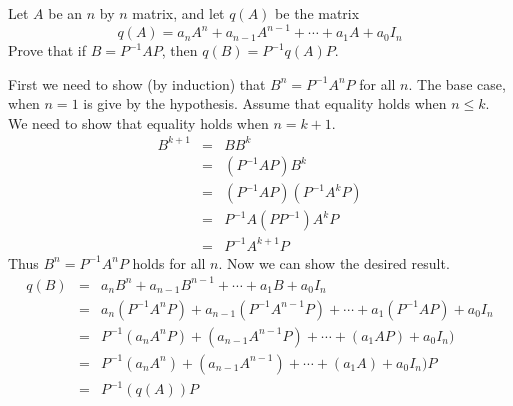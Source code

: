 \ii \label{ex:conjpoly}
Let $A$ be an $n$ by $n$ matrix, and let $q(A)$ be the matrix
$$
q(A) = a_nA^n +a_{n-1}A^{n-1}+\cdots+a_1A+a_0I_n
$$
Prove that if $B = P^{-1}AP$, then $q(B) = P^{-1}q(A)P$.
\\
\begin{solution}
First we need to show (by induction) that $B^n =P^{-1}A^nP$ for all $n$. The base case, when $n=1$ is give by the hypothesis. Assume that equality holds when $n \leq k$. We need to show that equality holds when $n = k+1$.
\begin{eqnarray*}
B^{k+1} &=& BB^k\\
&=&(P^{-1}AP)B^k\\
&=& (P^{-1}AP)(P^{-1}A^kP)\\
&=& P^{-1}A(PP^{-1})A^kP\\
&=&P^{-1}A^{k+1}P
\end{eqnarray*}
Thus $B^n =P^{-1}A^nP$ holds for all $n$. Now we can show the desired result.
\begin{eqnarray*}
q(B) &=& a_nB^n + a_{n-1}B^{n-1}+\cdots+a_1B+a_0I_n\\
&=& a_n(P^{-1}A^nP) + a_{n-1}(P^{-1}A^{n-1}P)+\cdots+a_1(P^{-1}AP)+a_0I_n\\
&=& P^{-1}(a_nA^nP) + (a_{n-1}A^{n-1}P)+\cdots+(a_1AP)+a_0I_n)\\
&=&P^{-1}(a_nA^n) + (a_{n-1}A^{n-1})+\cdots+(a_1A)+a_0I_n)P\\
&=& P^{-1}(q(A))P
\end{eqnarray*}
\end{solution}

